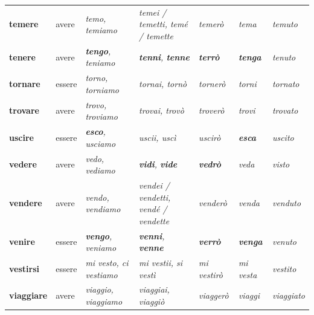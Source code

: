 \documentclass[11pt,a4paper,twoside,openright]{book}
\newcommand{\irr}[1]{{\color{exccol}\bfseries #1}}
\begin{document}
{\begin{xltabular}{\linewidth}{@{}>{\raggedright\arraybackslash}p{2.7cm} l L L l >{\raggedright\arraybackslash}p{1.9cm} l@{}}
\textbf{temere} & avere & \textit{temo, temiamo} & \textit{temei / temetti, temé / temette} & \textit{temerò} & \textit{tema} & \textit{temuto} \\
\textbf{tenere} & avere & \textit{\irr{tengo}, teniamo} & \textit{\irr{tenni}, \irr{tenne}} & \textit{\irr{terrò}} & \textit{\irr{tenga}} & \textit{tenuto} \\
\textbf{tornare} & essere & \textit{torno, torniamo} & \textit{tornai, tornò} & \textit{tornerò} & \textit{torni} & \textit{tornato} \\
\textbf{trovare} & avere & \textit{trovo, troviamo} & \textit{trovai, trovò} & \textit{troverò} & \textit{trovi} & \textit{trovato} \\
\textbf{uscire} & essere & \textit{\irr{esco}, usciamo} & \textit{uscii, uscì} & \textit{uscirò} & \textit{\irr{esca}} & \textit{uscito} \\
\textbf{vedere} & avere & \textit{vedo, vediamo} & \textit{\irr{vidi}, \irr{vide}} & \textit{\irr{vedrò}} & \textit{veda} & \textit{visto} \\
\textbf{vendere} & avere & \textit{vendo, vendiamo} & \textit{vendei / vendetti, vendé / vendette} & \textit{venderò} & \textit{venda} & \textit{venduto} \\
\textbf{venire} & essere & \textit{\irr{vengo}, veniamo} & \textit{\irr{venni}, \irr{venne}} & \textit{\irr{verrò}} & \textit{\irr{venga}} & \textit{venuto} \\
\textbf{vestirsi} & essere & \textit{mi vesto, ci vestiamo} & \textit{mi vestii, si vestì} & \textit{mi vestirò} & \textit{mi vesta} & \textit{vestito} \\
\textbf{viaggiare} & avere & \textit{viaggio, viaggiamo} & \textit{viaggiai, viaggiò} & \textit{viaggerò} & \textit{viaggi} & \textit{viaggiato} \\

\end{xltabular}}
\end{document}

